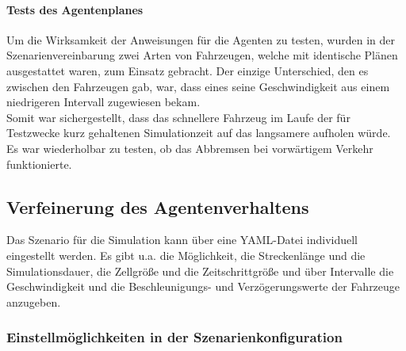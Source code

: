 \paragraph*{Tests des Agentenplanes}
Um die Wirksamkeit der Anweisungen für die Agenten zu testen, wurden in der Szenarienvereinbarung zwei Arten von Fahrzeugen, welche mit identische Plänen ausgestattet waren, zum Einsatz gebracht.
Der einzige Unterschied, den es zwischen den Fahrzeugen gab, war, dass eines seine Geschwindigkeit aus einem niedrigeren Intervall zugewiesen bekam.
\\
Somit war sichergestellt, dass das schnellere Fahrzeug im Laufe der für Testzwecke kurz gehaltenen Simulationzeit auf das langsamere aufholen würde.
Es war wiederholbar zu testen, ob das Abbremsen bei vorwärtigem Verkehr funktionierte.







\subsection{Verfeinerung des Agentenverhaltens}
\label{sec:verfeinerung-agentenplan}

Das Szenario für die Simulation kann über eine YAML-Datei individuell eingestellt werden.
Es gibt u.a. die Möglichkeit, die Streckenlänge und die Simulationsdauer, die Zellgröße und die Zeitschrittgröße und über Intervalle die Geschwindigkeit und die Beschleunigungs- und Verzögerungswerte der Fahrzeuge anzugeben.



\subsubsection{Einstellmöglichkeiten in der Szenarienkonfiguration}
\label{einstellungen-szenario}


